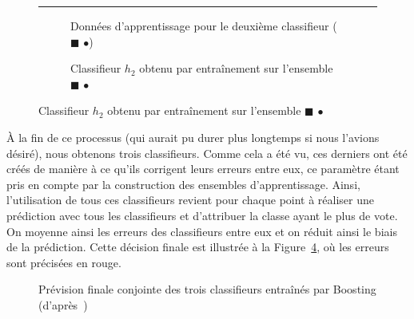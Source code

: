 \begin{figure}[h]
	\begin{margincap}
		\rule{\textwidth}{0pt}
		\caption{Troisième modèle appris sur les données (d'après~\cite{bib:elghazel})}
	\end{margincap}
	\begin{subfigure}{.45\textwidth}
		
		\caption{Données d'apprentissage pour le deuxième classifieur ($\blacksquare$ \large{$\bullet$})}
		\label{fig:boosting_trois_app}
	\end{subfigure}\hfill
	\begin{subfigure}{.45\textwidth}
		
		\caption{Classifieur $h_2$ obtenu par entraînement sur l'ensemble $\blacksquare$ \large{$\bullet$}}
		\label{fig:boosting_trois_modele}
	\end{subfigure}\hfill
\end{figure}

À la fin de ce processus (qui aurait pu durer plus longtemps si nous l'avions désiré), nous obtenons trois classifieurs. Comme cela a été vu, ces derniers ont été créés de manière à ce qu'ils corrigent leurs erreurs entre eux, ce paramètre étant pris en compte par la construction des ensembles d'apprentissage. Ainsi, l'utilisation de tous ces classifieurs revient pour chaque point à réaliser une prédiction avec tous les classifieurs et d'attribuer la classe ayant le plus de vote. On moyenne ainsi les erreurs des classifieurs entre eux et on réduit ainsi le biais de la prédiction. Cette décision finale est illustrée à la Figure~\ref{fig:boosting_final}, où les erreurs sont précisées en rouge.

\begin{figure}[h]
	\begin{margincap}
	\centering
	
	\caption{Prévision finale conjointe des trois classifieurs entraînés par Boosting (d'après~\cite{bib:elghazel})}
	\label{fig:boosting_final}
	\end{margincap}
\end{figure}

